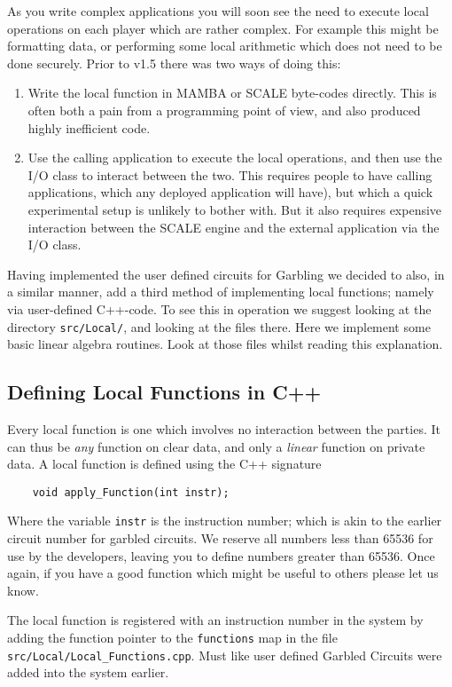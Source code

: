 \label{sec:Local}
As you write complex applications you will soon see the
need to execute local operations on each player which are
rather complex. For example this might be formatting data,
or performing some local arithmetic which does not need
to be done securely. 
Prior to v1.5 there was two ways of doing this:
\begin{enumerate}
\item Write the local function in MAMBA or SCALE byte-codes
directly. This is often both a pain from a programming point
of view, and also produced highly inefficient code.
\item Use the calling application to execute the local
operations, and then use the I/O class to interact
between the two. This requires people to have calling
applications, which any deployed application will have),
but which a quick experimental setup is unlikely to
bother with.
But it also requires expensive interaction between the
SCALE engine and the external application via the I/O
class.
\end{enumerate}
Having implemented the user defined circuits for Garbling
we decided to also, in a similar manner, add a third method
of implementing local functions; namely via user-defined
C++-code.
To see this in operation we suggest looking at the directory
\verb|src/Local/|, and looking at the files there. Here
we implement some basic linear algebra routines.
Look at those files whilst reading this explanation.

\subsection{Defining Local Functions in C++}
Every local function is one which involves no interaction
between the parties.
It can thus be {\em any} function on clear data, and
only a {\em linear} function on private data.
A local function is defined using the C++ signature
\begin{lstlisting}
    void apply_Function(int instr);
\end{lstlisting}
Where the variable \verb|instr| is the instruction number; which is akin to the
earlier circuit number for garbled circuits.
We reserve all numbers less than 65536 for use by the developers, leaving
you to define numbers greater than 65536.
Once again, if you have a good function which might be useful to others
please let us know.

The local function is registered with an instruction number in the
system by adding the function pointer to the \verb|functions| map
in the file \verb|src/Local/Local_Functions.cpp|.
Must like user defined Garbled Circuits were added into the
system earlier.

